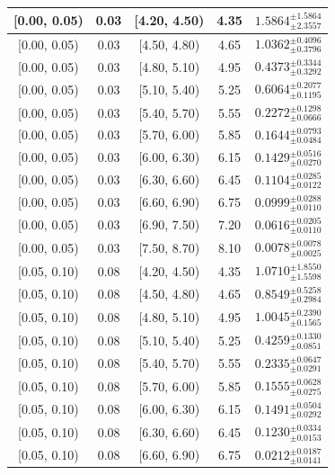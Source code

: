 \begin{longtable}{|c|c|c|c|c|}
\hline
\endlastfoot
[0.00, 0.05) & 0.03 & [4.20, 4.50) & 4.35 & $1.5864^{ \pm 1.5864 }_{ \pm 2.3557 }$ \\ 
\hline
[0.00, 0.05) & 0.03 & [4.50, 4.80) & 4.65 & $1.0362^{ \pm 0.4096 }_{ \pm 0.3796 }$ \\ 
\hline
[0.00, 0.05) & 0.03 & [4.80, 5.10) & 4.95 & $0.4373^{ \pm 0.3344 }_{ \pm 0.3292 }$ \\ 
\hline
[0.00, 0.05) & 0.03 & [5.10, 5.40) & 5.25 & $0.6064^{ \pm 0.2077 }_{ \pm 0.1195 }$ \\ 
\hline
[0.00, 0.05) & 0.03 & [5.40, 5.70) & 5.55 & $0.2272^{ \pm 0.1298 }_{ \pm 0.0666 }$ \\ 
\hline
[0.00, 0.05) & 0.03 & [5.70, 6.00) & 5.85 & $0.1644^{ \pm 0.0793 }_{ \pm 0.0484 }$ \\ 
\hline
[0.00, 0.05) & 0.03 & [6.00, 6.30) & 6.15 & $0.1429^{ \pm 0.0516 }_{ \pm 0.0270 }$ \\ 
\hline
[0.00, 0.05) & 0.03 & [6.30, 6.60) & 6.45 & $0.1104^{ \pm 0.0285 }_{ \pm 0.0122 }$ \\ 
\hline
[0.00, 0.05) & 0.03 & [6.60, 6.90) & 6.75 & $0.0999^{ \pm 0.0288 }_{ \pm 0.0110 }$ \\ 
\hline
[0.00, 0.05) & 0.03 & [6.90, 7.50) & 7.20 & $0.0616^{ \pm 0.0205 }_{ \pm 0.0110 }$ \\ 
\hline
[0.00, 0.05) & 0.03 & [7.50, 8.70) & 8.10 & $0.0078^{ \pm 0.0078 }_{ \pm 0.0025 }$ \\ 
\hline
[0.05, 0.10) & 0.08 & [4.20, 4.50) & 4.35 & $1.0710^{ \pm 1.8550 }_{ \pm 1.5598 }$ \\ 
\hline
[0.05, 0.10) & 0.08 & [4.50, 4.80) & 4.65 & $0.8549^{ \pm 0.5258 }_{ \pm 0.2984 }$ \\ 
\hline
[0.05, 0.10) & 0.08 & [4.80, 5.10) & 4.95 & $1.0045^{ \pm 0.2390 }_{ \pm 0.1565 }$ \\ 
\hline
[0.05, 0.10) & 0.08 & [5.10, 5.40) & 5.25 & $0.4259^{ \pm 0.1330 }_{ \pm 0.0851 }$ \\ 
\hline
[0.05, 0.10) & 0.08 & [5.40, 5.70) & 5.55 & $0.2335^{ \pm 0.0647 }_{ \pm 0.0291 }$ \\ 
\hline
[0.05, 0.10) & 0.08 & [5.70, 6.00) & 5.85 & $0.1555^{ \pm 0.0628 }_{ \pm 0.0275 }$ \\ 
\hline
[0.05, 0.10) & 0.08 & [6.00, 6.30) & 6.15 & $0.1491^{ \pm 0.0504 }_{ \pm 0.0292 }$ \\ 
\hline
[0.05, 0.10) & 0.08 & [6.30, 6.60) & 6.45 & $0.1230^{ \pm 0.0334 }_{ \pm 0.0153 }$ \\ 
\hline
[0.05, 0.10) & 0.08 & [6.60, 6.90) & 6.75 & $0.0212^{ \pm 0.0187 }_{ \pm 0.0141 }$ \\ 

\end{longtable}
